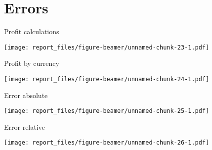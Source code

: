 \documentclass[ignorenonframetext,]{beamer}
\begin{document}
\hypertarget{errors}{%
\section{Errors}\label{errors}}

\begin{frame}{Profit calculations}
\protect\hypertarget{profit-calculations}{}

\texttt{[image: report\_files/figure-beamer/unnamed-chunk-23-1.pdf]}

\end{frame}

\begin{frame}{Profit by currency}
\protect\hypertarget{profit-by-currency}{}

\texttt{[image: report\_files/figure-beamer/unnamed-chunk-24-1.pdf]}

\end{frame}

\begin{frame}{Error absolute}
\protect\hypertarget{error-absolute}{}

\texttt{[image: report\_files/figure-beamer/unnamed-chunk-25-1.pdf]}

\end{frame}

\begin{frame}{Error relative}
\protect\hypertarget{error-relative}{}

\texttt{[image: report\_files/figure-beamer/unnamed-chunk-26-1.pdf]}

\end{frame}
\end{document}
